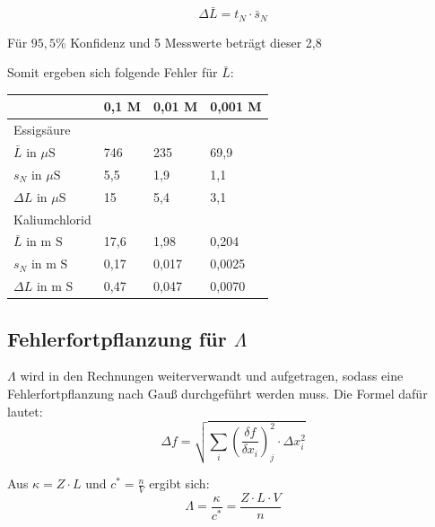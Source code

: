 \documentclass[12pt,a4paper,titlepage,headinclude,bibtotoc]{scrartcl}
\begin{document}
\begin{equation}
\Delta \bar{L} = t_N \cdot \bar{s}_N
\end{equation}

Für $95,5 \%$ Konfidenz und 5 Messwerte beträgt dieser 2,8\protect\footnotemark



Somit ergeben sich folgende Fehler für $\bar{L}$:

\begin{table} [h]
\centering 
\begin{tabular}{|p{4cm}||p{2cm}|p{2cm}|p{2cm}|}
\hline
& 0,1 M & 0,01 M & 0,001 M \\
\hline
Essigsäure & & & \\
$\bar{L}$ in $\mu \mathrm{S}$ &746 & 235 & 69,9\\
$s_N$ in $\mu \mathrm{S}$ & 5,5 & 1,9 & 1,1 \\
$\Delta L$ in $\mu \mathrm{S}$ & 15& 5,4& 3,1\\
\hline
Kaliumchlorid & & &\\
$\bar{L}$ in m $\mathrm{S}$& 17,6 & 1,98 & 0,204\\
$s_N$ in m $\mathrm{S}$ & 0,17 & 0,017 & 0,0025\\
$\Delta L$ in m $\mathrm{S}$ & 0,47& 0,047& 0,0070\\
\hline
\end{tabular}
\end{table}

\newpage
\subsection{Fehlerfortpflanzung für $\Lambda$}
$\Lambda$ wird in den Rechnungen weiterverwandt und aufgetragen, sodass eine Fehlerfortpflanzung nach Gauß durchgeführt werden muss. Die Formel dafür lautet:\\

\begin{equation}
\Delta f = \sqrt{\sum_i \left(\frac{\delta f}{\delta x_i}\right)^2_j \cdot \Delta x_i^2}
\end{equation}

Aus $\kappa = Z \cdot L$ und $c^* =\frac{n}{V}$ ergibt sich:\\

\begin{equation}
\Lambda = \frac{\kappa}{c^*}= \frac{Z \cdot L \cdot V}{n}
\end{equation}
\end{document}
